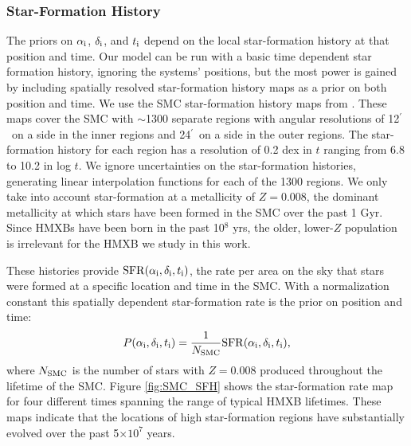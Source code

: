 \documentclass[usenatbib]{mnras}
\newcommand{\amin}{\ifmmode {^{\prime}\ }\else$^{\prime}$\fi}
\begin{document}
\subsubsection{Star-Formation History}


The priors on $\alpha_{\rm i}$, $\delta_{\rm i}$, and $t_{\rm i}$ depend on the local star-formation history at that position and time. Our model can be run with a basic time dependent star formation history, ignoring the systems' positions, but the most power is gained by including spatially resolved star-formation history maps as a prior on both position and time. We use the SMC star-formation history maps from \citet{harris04}. These maps cover the SMC with $\sim$1300 separate regions with angular resolutions of 12\amin\ on a side in the inner regions and 24\amin\ on a side in the outer regions. The star-formation history for each region has a resolution of 0.2 dex in $t$ ranging from 6.8 to 10.2 in log $t$. We ignore uncertainties on the star-formation histories, generating linear interpolation functions for each of the 1300 regions. We only take into account star-formation at a metallicity of $Z=0.008$, the dominant metallicity at which stars have been formed in the SMC over the past 1 Gyr. Since HMXBs have been born in the past 10$^8$ yrs, the older, lower-$Z$ population is irrelevant for the HMXB we study in this work.

These histories provide ${\rm SFR}(\alpha_{\rm i}, \delta_{\rm i}, t_{\rm i})$, the rate per area on the sky that stars were formed at a specific location and time in the SMC. With a normalization constant this spatially dependent star-formation rate is the prior on position and time:
\begin{equation}
P(\alpha_{\rm i}, \delta_{\rm i}, t_{\rm i}) = \frac{1}{N_{\rm SMC}} {\rm SFR}(\alpha_{\rm i}, \delta_{\rm i}, t_{\rm i}),
\end{equation}
where $N_{\rm SMC}$ is the number of stars with $Z=0.008$ produced throughout the lifetime of the SMC. Figure \ref{fig:SMC_SFH} shows the star-formation rate map for four different times spanning the range of typical HMXB lifetimes. These maps indicate that the locations of high star-formation regions have substantially evolved over the past 5$\times10^7$ years.



\end{document}

